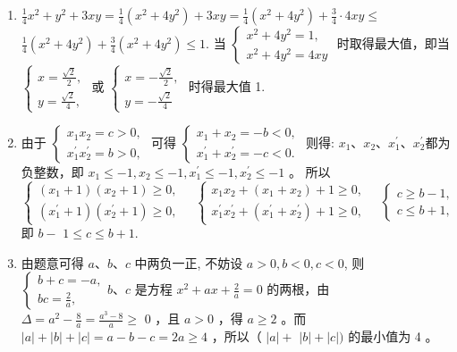 \documentclass[10pt]{article}
\begin{document}
\begin{enumerate}
  \item $\frac{1}{4} x^{2}+y^{2}+3 x y=\frac{1}{4}\left(x^{2}+4 y^{2}\right)+3 x y=\frac{1}{4}\left(x^{2}+4 y^{2}\right)+\frac{3}{4} \cdot 4 x y \leqslant$ $\frac{1}{4}\left(x^{2}+4 y^{2}\right)+\frac{3}{4}\left(x^{2}+4 y^{2}\right) \leqslant 1$. 当 $\left\{\begin{array}{l}x^{2}+4 y^{2}=1, \\ x^{2}+4 y^{2}=4 x y\end{array}\right.$ 时取得最大值，即当 $\left\{\begin{array}{l}x=\frac{\sqrt{2}}{2}, \\ y=\frac{\sqrt{2}}{4},\end{array}\right.$ 或 $\left\{\begin{array}{l}x=-\frac{\sqrt{2}}{2}, \\ y=-\frac{\sqrt{2}}{4}\end{array}\right.$ 时得最大值 1.
  \item 由于 $\left\{\begin{array}{l}x_{1} x_{2}=c>0, \\ x_{1}^{\prime} x_{2}^{\prime}=b>0,\end{array}\right.$ 可得 $\left\{\begin{array}{l}x_{1}+x_{2}=-b<0, \\ x_{1}^{\prime}+x_{2}^{\prime}=-c<0 .\end{array}\right.$ 则得: $x_{1} 、 x_{2} 、 x_{1}^{\prime} 、 x_{2}^{\prime}$都为负整数，即 $x_{1} \leqslant-1, x_{2} \leqslant-1, x_{1}^{\prime} \leqslant-1, x_{2}^{\prime} \leqslant-1$ 。 所以\\
$\left\{\begin{array}{l}\left(x_{1}+1\right)\left(x_{2}+1\right) \geqslant 0, \\ \left(x_{1}^{\prime}+1\right)\left(x_{2}^{\prime}+1\right) \geqslant 0,\end{array} \quad\left\{\begin{array}{l}x_{1} x_{2}+\left(x_{1}+x_{2}\right)+1 \geqslant 0, \\ x_{1}^{\prime} x_{2}^{\prime}+\left(x_{1}^{\prime}+x_{2}^{\prime}\right)+1 \geqslant 0,\end{array} \quad\left\{\begin{array}{l}c \geqslant b-1, \\ c \leqslant b+1,\end{array}\right.\right.\right.$ 即 $b-$ $1 \leqslant c \leqslant b+1$.
  \item 由题意可得 $a 、 b 、 c$ 中两负一正, 不妨设 $a>0, b<0, c<0$, 则 $\left\{\begin{array}{l}b+c=-a, \\ b c=\frac{2}{a},\end{array} b 、 c\right.$ 是方程 $x^{2}+a x+\frac{2}{a}=0$ 的两根，由 $\Delta=a^{2}-\frac{8}{a}=\frac{a^{3}-8}{a} \geqslant$ 0 ，且 $a>0$ ，得 $a \geqslant 2$ 。而 $|a|+|b|+|c|=a-b-c=2 a \geqslant 4$ ，所以（ $|a|+$ $|b|+|c|)$ 的最小值为 4 。

\end{enumerate}
\end{document}
